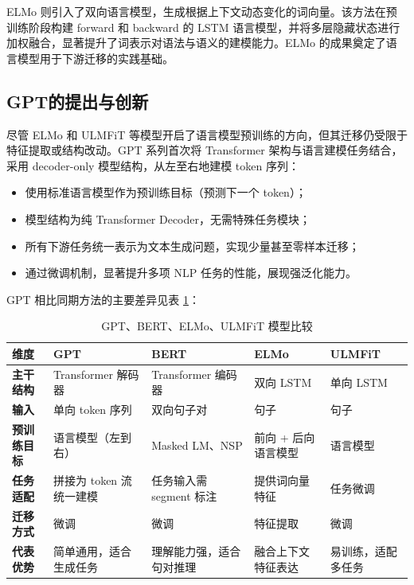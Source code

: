 \documentclass[a4paper,12pt]{article}
\begin{document}
    ELMo 则引入了双向语言模型，生成根据上下文动态变化的词向量。该方法在预训练阶段构建 forward 和 backward 的 LSTM 语言模型，并将多层隐藏状态进行加权融合，显著提升了词表示对语法与语义的建模能力。ELMo 的成果奠定了语言模型用于下游迁移的实践基础。
    
    \subsection{GPT的提出与创新}
    
    尽管 ELMo 和 ULMFiT 等模型开启了语言模型预训练的方向，但其迁移仍受限于特征提取或结构改动。GPT 系列首次将 Transformer 架构与语言建模任务结合，采用 decoder-only 模型结构，从左至右地建模 token 序列：
    
    \begin{itemize}
        \item 使用标准语言模型作为预训练目标（预测下一个 token）；
        \item 模型结构为纯 Transformer Decoder，无需特殊任务模块；
        \item 所有下游任务统一表示为文本生成问题，实现少量甚至零样本迁移；
        \item 通过微调机制，显著提升多项 NLP 任务的性能，展现强泛化能力。
    \end{itemize}
    
    GPT 相比同期方法的主要差异见表 \ref{tab:pretrained_models_comparison}：
    
    \begin{table}[H]
        \centering
        \begin{tabularx}{\textwidth}{|l|X|X|X|X|}
            \hline
            \textbf{维度} & \textbf{GPT} & \textbf{BERT} & \textbf{ELMo} & \textbf{ULMFiT} \\
            \hline
            \textbf{主干结构} & Transformer 解码器 & Transformer 编码器 & 双向 LSTM & 单向 LSTM \\
            \hline
            \textbf{输入} & 单向 token 序列 & 双向句子对 & 句子 & 句子 \\
            \hline
            \textbf{预训练目标} & 语言模型（左到右） & Masked LM、NSP & 前向 + 后向语言模型 & 语言模型 \\
            \hline
            \textbf{任务适配} & 拼接为 token 流统一建模 & 任务输入需 segment 标注 & 提供词向量特征 & 任务微调 \\
            \hline
            \textbf{迁移方式} & 微调 & 微调 & 特征提取 & 微调 \\
            \hline
            \textbf{代表优势} & 简单通用，适合生成任务 & 理解能力强，适合句对推理 & 融合上下文特征表达 & 易训练，适配多任务 \\
            \hline
        \end{tabularx}
        \caption{GPT、BERT、ELMo、ULMFiT 模型比较}
        \label{tab:pretrained_models_comparison}
    \end{table}
    
\end{document}
